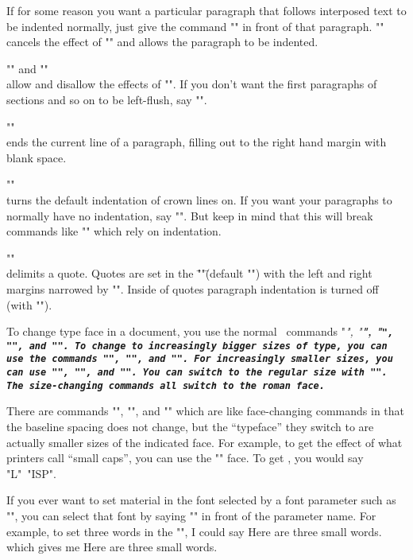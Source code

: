 If for some reason you want a particular paragraph that follows
interposed text to be indented normally, just give the command
\+"\unvpar"\+ in front of that paragraph.  "\unvpar" cancels the
effect of "\vpar" and allows the paragraph to be indented.

\begingab

\*\:"\vpartrue"\: and "\vparfalse"\\allow and disallow the
effects of "\vpar".  If you don't want the first paragraphs of
sections and so on to be left-flush, say "\vparfalse".

\*\+"\linebreak"\+\\ends the current line of a paragraph, filling
out to the right hand margin with blank space.

\*\:"\onindent"\:\\turns the default indentation of crown lines
on.  If you want your paragraphs to normally have no indentation,
say "\offindent".  But keep in mind that this will break commands
like "\bpar" which rely on indentation.

\*\+"\beginquote"\+\\delimits a quote.  Quotes are set in the
\="\quotefont"\= (default "\smlsize\rm") with the left and right
margins narrowed by "\parindent".  Inside of quotes paragraph
indentation is turned off (with "\offindent").

\endgab


To change type face in a document, you use the normal \tex\
commands "\it", "\bf", "\tt", "\sl", and "\rm".  To change to
increasingly bigger sizes of type, you can use the commands
\+"\bigsize"\+, \+"\biggsize"\+, and \+"\bigggsize"\+.  For
increasingly smaller sizes, you can use \+"\smlsize"\+,
\+"\smllsize"\+, and \+"\smlllsize"\+.  You can switch to the
regular size with \+"\regsize"\+.  The size-changing commands all
switch to the roman face.

There are commands \+"\smlrm"\+, \+"\smllrm"\+, and \+"\smltt"\+
which are like face-changing commands in that the baseline
spacing does not change, but the ``typeface'' they switch to are
actually smaller sizes of the indicated face.  For example, to
get the effect of what printers call ``small caps'', you can use
the "\smllrm" face.  To get \lisp, you would say
"L{\smllrm"~"ISP}".

If you ever want to set material in the font selected by a font
parameter such as "\titlefont", you can select that font by
saying "\the" in front of the parameter name.  For example, to
set three words in the "\captionfont", I could say
\beginverb
Here are {\the\captionfont three small words}.
\endverb
which gives me
\begintext
Here are {\the\captionfont{}three small words}.
\endtext
\vpar

